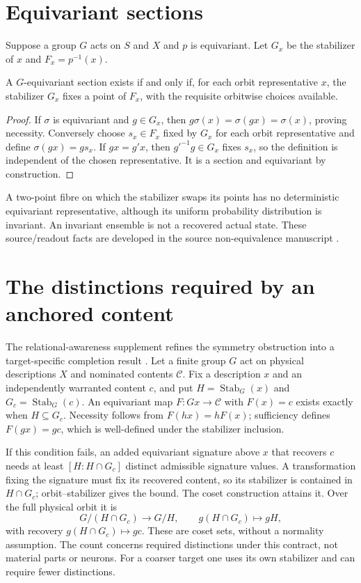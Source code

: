 \section{Equivariant sections}\label{section:reconstruction:equivariant-sections}
Suppose a group $G$ acts on $S$ and $X$ and $p$ is equivariant. Let $G_x$ be the stabilizer of $x$ and $F_x=p^{-1}(x)$.
\begin{proposition}
A $G$-equivariant section exists if and only if, for each orbit representative $x$, the stabilizer $G_x$ fixes a point of $F_x$, with the requisite orbitwise choices available.
\end{proposition}
\begin{proof}
If $\sigma$ is equivariant and $g\in G_x$, then $g\sigma(x)=\sigma(gx)=\sigma(x)$, proving necessity. Conversely choose $s_x\in F_x$ fixed by $G_x$ for each orbit representative and define $\sigma(gx)=gs_x$. If $gx=g'x$, then $g'^{-1}g\in G_x$ fixes $s_x$, so the definition is independent of the chosen representative. It is a section and equivariant by construction.
\end{proof}
A two-point fibre on which the stabilizer swaps its points has no deterministic equivariant representative, although its uniform probability distribution is invariant. An invariant ensemble is not a recovered actual state. These source/readout facts are developed in the source non-equivalence manuscript \cite{RodgersSource}.

\section{The distinctions required by an anchored content}\label{sec:anchored-content-signature}
The relational-awareness supplement refines the symmetry obstruction into a target-specific completion result \cite[Sections~9.2--9.4]{RodgersRelationalSupplement2026}. Let a finite group $G$ act on physical descriptions $X$ and nominated contents $\mathcal C$. Fix a description $x$ and an independently warranted content $c$, and put $H=\operatorname{Stab}_G(x)$ and $G_c=\operatorname{Stab}_G(c)$. An equivariant map $F:Gx\to\mathcal C$ with $F(x)=c$ exists exactly when $H\subseteq G_c$. Necessity follows from $F(hx)=hF(x)$; sufficiency defines $F(gx)=gc$, which is well-defined under the stabilizer inclusion.

If this condition fails, an added equivariant signature above $x$ that recovers $c$ needs at least $[H:H\cap G_c]$ distinct admissible signature values. A transformation fixing the signature must fix its recovered content, so its stabilizer is contained in $H\cap G_c$; orbit--stabilizer gives the bound. The coset construction attains it. Over the full physical orbit it is
\[
 G/(H\cap G_c)\longrightarrow G/H,\qquad
 g(H\cap G_c)\longmapsto gH,
\]
with recovery $g(H\cap G_c)\mapsto gc$. These are coset sets, without a normality assumption. The count concerns required distinctions under this contract, not material parts or neurons. For a coarser target one uses its own stabilizer and can require fewer distinctions.

